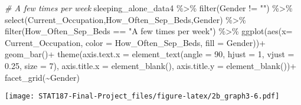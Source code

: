 \documentclass[
]{article}
\newenvironment{Shaded}{\begin{snugshade}}{\end{snugshade}}
\newcommand{\AttributeTok}[1]{\textcolor[rgb]{0.77,0.63,0.00}{#1}}
\newcommand{\CommentTok}[1]{\textcolor[rgb]{0.56,0.35,0.01}{\textit{#1}}}
\newcommand{\DecValTok}[1]{\textcolor[rgb]{0.00,0.00,0.81}{#1}}
\newcommand{\FloatTok}[1]{\textcolor[rgb]{0.00,0.00,0.81}{#1}}
\newcommand{\FunctionTok}[1]{\textcolor[rgb]{0.00,0.00,0.00}{#1}}
\newcommand{\NormalTok}[1]{#1}
\newcommand{\SpecialCharTok}[1]{\textcolor[rgb]{0.00,0.00,0.00}{#1}}
\newcommand{\StringTok}[1]{\textcolor[rgb]{0.31,0.60,0.02}{#1}}
\begin{document}
\begin{Shaded}
\begin{Highlighting}[]
\CommentTok{\# A few times per week}
\NormalTok{sleeping\_alone\_data4 }\SpecialCharTok{\%\textgreater{}\%} \FunctionTok{filter}\NormalTok{(Gender }\SpecialCharTok{!=} \StringTok{""}\NormalTok{) }\SpecialCharTok{\%\textgreater{}\%}
  \FunctionTok{select}\NormalTok{(Current\_Occupation,How\_Often\_Sep\_Beds,Gender) }\SpecialCharTok{\%\textgreater{}\%}
  \FunctionTok{filter}\NormalTok{(How\_Often\_Sep\_Beds }\SpecialCharTok{==} \StringTok{"A few times per week"}\NormalTok{) }\SpecialCharTok{\%\textgreater{}\%}
  \FunctionTok{ggplot}\NormalTok{(}\FunctionTok{aes}\NormalTok{(}\AttributeTok{x=}\NormalTok{ Current\_Occupation,}
             \AttributeTok{color =}\NormalTok{ How\_Often\_Sep\_Beds,}
             \AttributeTok{fill =}\NormalTok{ Gender))}\SpecialCharTok{+}
  \FunctionTok{geom\_bar}\NormalTok{()}\SpecialCharTok{+}
  \FunctionTok{theme}\NormalTok{(}\AttributeTok{axis.text.x =} \FunctionTok{element\_text}\NormalTok{(}\AttributeTok{angle =} \DecValTok{90}\NormalTok{,}
                                   \AttributeTok{hjust =} \DecValTok{1}\NormalTok{,}
                                   \AttributeTok{vjust =} \FloatTok{0.25}\NormalTok{,}
                                   \AttributeTok{size =} \DecValTok{7}\NormalTok{),}
        \AttributeTok{axis.title.x =} \FunctionTok{element\_blank}\NormalTok{(),}
        \AttributeTok{axis.title.y =} \FunctionTok{element\_blank}\NormalTok{())}\SpecialCharTok{+}
  \FunctionTok{facet\_grid}\NormalTok{(}\SpecialCharTok{\textasciitilde{}}\NormalTok{Gender)}
\end{Highlighting}
\end{Shaded}

\texttt{[image: STAT187-Final-Project\_files/figure-latex/2b\_graph3-6.pdf]}
\end{document}
